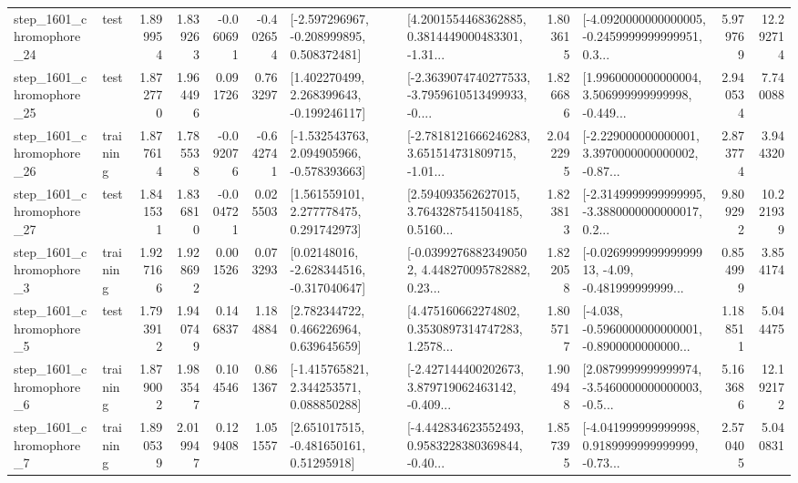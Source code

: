 \begin{tabular}{llrrrrllrlrr}
 step\_1601\_chromophore\_24 &      test &      1.899954 &    1.839263 &     -0.060691 & -0.402654 &   [-2.597296967, -0.208999895, 0.508372481] &  [4.2001554468362885, 0.3814449000483301, -1.31... &       1.803615 &  [-4.0920000000000005, -0.2459999999999951, 0.3... &            5.979769 &         12.292714 \\
 step\_1601\_chromophore\_25 &      test &      1.872770 &    1.964496 &      0.091726 &  0.763297 &    [1.402270499, 2.268399643, -0.199246117] &  [-2.3639074740277533, -3.7959610513499933, -0.... &       1.826686 &  [1.9960000000000004, 3.506999999999998, -0.449... &            2.940534 &          7.740088 \\
 step\_1601\_chromophore\_26 &  training &      1.877614 &    1.785538 &     -0.092076 & -0.642741 &   [-1.532543763, 2.094905966, -0.578393663] &  [-2.7818121666246283, 3.651514731809715, -1.01... &       2.042295 &  [-2.229000000000001, 3.3970000000000002, -0.87... &            2.873774 &          3.944320 \\
 step\_1601\_chromophore\_27 &      test &      1.841531 &    1.836810 &     -0.004721 &  0.025503 &     [1.561559101, 2.277778475, 0.291742973] &  [2.594093562627015, 3.7643287541504185, 0.5160... &       1.823813 &  [-2.3149999999999995, -3.3880000000000017, 0.2... &            9.809292 &         10.221939 \\
  step\_1601\_chromophore\_3 &  training &      1.927166 &    1.928692 &      0.001526 &  0.073293 &    [0.02148016, -2.628344516, -0.317040647] &  [-0.03992768823490502, 4.448270095782882, 0.23... &       1.822058 &  [-0.026999999999999913, -4.09, -0.481999999999... &            0.854999 &          3.854174 \\
  step\_1601\_chromophore\_5 &      test &      1.793912 &    1.940749 &      0.146837 &  1.184884 &     [2.782344722, 0.466226964, 0.639645659] &  [4.475160662274802, 0.3530897314747283, 1.2578... &       1.805717 &  [-4.038, -0.5960000000000001, -0.8900000000000... &            1.188511 &          5.044475 \\
  step\_1601\_chromophore\_6 &  training &      1.879002 &    1.983547 &      0.104546 &  0.861367 &    [-1.415765821, 2.344253571, 0.088850288] &  [-2.427144400202673, 3.879719062463142, -0.409... &       1.904948 &  [2.0879999999999974, -3.5460000000000003, -0.5... &            5.163686 &         12.192172 \\
  step\_1601\_chromophore\_7 &  training &      1.890539 &    2.019947 &      0.129408 &  1.051557 &     [2.651017515, -0.481650161, 0.51295918] &  [-4.442834623552493, 0.9583228380369844, -0.40... &       1.857395 &  [-4.041999999999998, 0.9189999999999999, -0.73... &            2.570405 &          5.040831 \\

\end{tabular}

